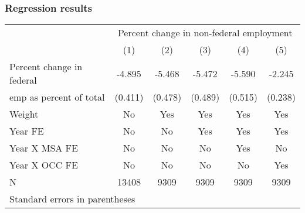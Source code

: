 \documentclass[aspectratio=169]{beamer}
\begin{document}
\begin{frame}
    \frametitle{Regression results}

    \begin{table}[width = \textwidth]
        {\centering
        \begin{tabular}{l*{5}{c}}
            \toprule
            &\multicolumn{5}{c}{Percent change in non-federal employment} \\
            &\multicolumn{1}{c}{(1)}&\multicolumn{1}{c}{(2)}&\multicolumn{1}{c}{(3)}&\multicolumn{1}{c}{(4)}&\multicolumn{1}{c}{(5)} \\
            \midrule
            Percent change in federal &      -4.895&      -5.468&      -5.472&      -5.590&      -2.245\\
            emp as percent of total &     (0.411)&     (0.478)&     (0.489)&     (0.515)&     (0.238)\\
            \midrule
            Weight              &          No&         Yes&         Yes&         Yes&         Yes\\
            Year FE             &          No&          No&         Yes&         Yes&         Yes\\
            Year X MSA FE       &          No&          No&          No&         Yes&          No\\
            Year X OCC FE       &          No&          No&          No&          No&         Yes\\
            N                   &       13408&        9309&        9309&        9309&        9309\\
            \bottomrule
            \multicolumn{6}{l}{\footnotesize Standard errors in parentheses}\\
            \end{tabular}
        }
    \end{table}

\end{frame}
\end{document}
